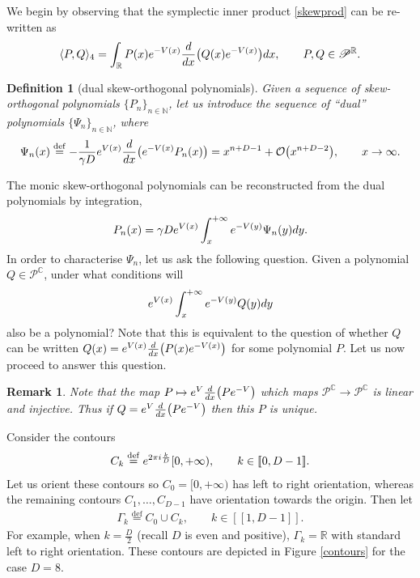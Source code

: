 \documentclass[11pt]{article}
\numberwithin{equation}{section}
\numberwithin{equation}{section}
\newtheorem{Definition}[Theorem]{Definition}
\newtheorem{Remark}[Theorem]{Remark}
\begin{document}
We begin by observing that the symplectic inner product \eqref{skewprod} can be re-written as
\[
\langle P, Q \rangle_4 = \int_{\mathbb{R}} P(x) {\rm e}^{-V(x)} \frac{\rm d}{{\rm d}x}\big( Q(x) {\rm e}^{-V(x)} \big) {\rm d}x,\qquad P,Q \in \mathscr{P}^\mathbb{R}.
\]
\begin{Definition}[dual skew-orthogonal polynomials]
Given a sequence of skew-orthogonal polynomials $\{ P_n \}_{n \in \mathbb{N}}$, let us introduce the sequence of \enquote{dual} polynomials $\{ \Psi_n \}_{n \in \mathbb{N}}$, where
\[%
\Psi_n(x) \overset{\mathrm{def}}{=} -\frac{1}{\gamma D} {\rm e}^{V(x)}\frac{\rm d}{{\rm d}x}\big( {\rm e}^{-V(x)} P_n(x) \big) = x^{n+D-1} + \mathcal{O}\big(x^{n+D-2}\big),\qquad x \to \infty.
\]
\end{Definition}
The monic skew-orthogonal polynomials can be reconstructed from the dual polynomials by integration,
\[
P_n(x) = \gamma D {\rm e}^{V(x)} \int_{x}^{+\infty} {\rm e}^{-V(y)} \Psi_n(y) {\rm d}y.
\]
In order to characterise $\Psi_n$, let us ask the following question. Given a polynomial $Q \in \mathscr{P}^\mathbb{C}$, under what conditions will
\begin{equation*}
{\rm e}^{V(x)} \int_{x}^{+\infty} {\rm e}^{-V(y)} Q(y) {\rm d}y
\end{equation*}
also be a polynomial? Note that this is equivalent to the question of whether $Q$ can be written $Q(x) = {\rm e}^{V(x)} \frac{\rm d}{{\rm d}x} \big( P(x) {\rm e}^{-V(x)} \big)$ for some polynomial $P$. Let us now proceed to answer this question.

\begin{Remark}\label{polyunique} Note that the map $P \mapsto {\rm e}^V \frac{\rm d}{{\rm d}x}\big(P {\rm e}^{-V}\big)$ which maps $\mathscr{P}^\mathbb{C}\to \mathscr{P}^\mathbb{C}$ is linear and injective. Thus if $Q = {\rm e}^V \frac{\rm d}{{\rm d}x}\big(P {\rm e}^{-V}\big)$ then this $P$ is unique.
\end{Remark}

Consider the contours
\begin{align}\label{contour1}
C_k \overset{\mathrm{def}}{=} {\rm e}^{2\pi {\rm i}\frac{k}{D}} [0,+\infty),\qquad k \in [\![ 0,D-1]\!].
\end{align}
Let us orient these contours so $C_0=[0,+\infty)$ has left to right orientation, whereas the remaining contours $C_1, \dots, C_{D-1}$ have orientation towards the origin. Then let
\begin{align}\label{contour2}
\Gamma_k \overset{\mathrm{def}}{=} C_0 \cup C_k,\qquad k \in [\![ 1,D-1]\!].
\end{align}
For example, when $k=\frac{D}{2}$ (recall $D$ is even and positive), $\Gamma_k = \mathbb{R}$ with standard left to right orientation. These contours are depicted in Figure \ref{contours} for the case $D=8$.
\end{document}
